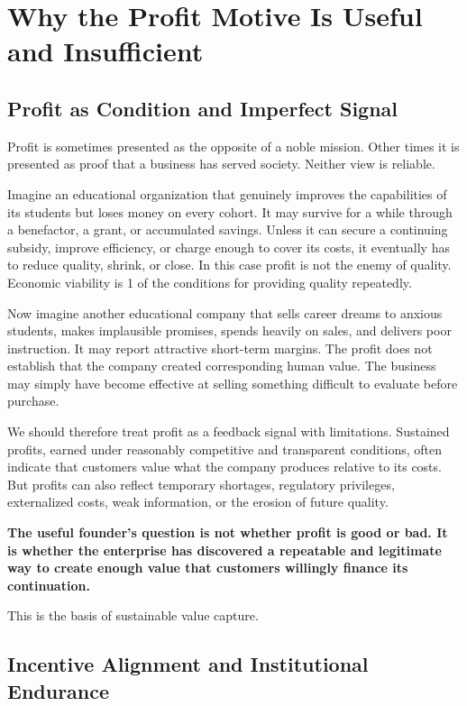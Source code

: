 \section{Why the Profit Motive Is Useful and Insufficient}

\subsection{Profit as Condition and Imperfect Signal}

Profit is sometimes presented as the opposite of a noble mission. Other times it is presented as proof that a business has served society. Neither view is reliable.

Imagine an educational organization that genuinely improves the capabilities of its students but loses money on every cohort. It may survive for a while through a benefactor, a grant, or accumulated savings. Unless it can secure a continuing subsidy, improve efficiency, or charge enough to cover its costs, it eventually has to reduce quality, shrink, or close. In this case profit is not the enemy of quality. Economic viability is 1 of the conditions for providing quality repeatedly.

Now imagine another educational company that sells career dreams to anxious students, makes implausible promises, spends heavily on sales, and delivers poor instruction. It may report attractive short-term margins. The profit does not establish that the company created corresponding human value. The business may simply have become effective at selling something difficult to evaluate before purchase.

We should therefore treat profit as a feedback signal with limitations. Sustained profits, earned under reasonably competitive and transparent conditions, often indicate that customers value what the company produces relative to its costs. But profits can also reflect temporary shortages, regulatory privileges, externalized costs, weak information, or the erosion of future quality.

\textbf{The useful founder's question is not whether profit is good or bad. It is whether the enterprise has discovered a repeatable and legitimate way to create enough value that customers willingly finance its continuation.}

This is the basis of sustainable value capture.

\subsection{Incentive Alignment and Institutional Endurance}

